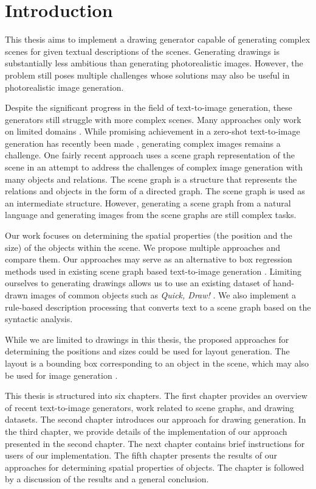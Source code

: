 \chapter*{Introduction}

This thesis aims to implement a drawing generator capable of generating complex scenes for given textual descriptions of the scenes. Generating drawings is substantially less ambitious than generating photorealistic images. However, the problem still poses multiple challenges whose solutions may also be useful in photorealistic image generation. 

\medskip

Despite the significant progress in the field of text-to-image generation, these generators still struggle with more complex scenes. Many approaches only work on limited domains \citep{zhang2017stackgan}. While promising achievement in a zero-shot text-to-image generation has recently been made \citep{ramesh2021zeroshot}, generating complex images remains a challenge. One fairly recent approach \citep{johnson2018image} uses a scene graph representation of the scene in an attempt to address the challenges of complex image generation with many objects and relations. The scene graph is a structure that represents the relations and objects in the form of a directed graph. The scene graph is used as an intermediate structure. However, generating a scene graph from a natural language and generating images from the scene graphs are still complex tasks. 

\medskip

Our work focuses on determining the spatial properties (the position and the size) of the objects within the scene. We propose multiple approaches and compare them. Our approaches may serve as an alternative to box regression methods used in existing scene graph based text-to-image generation \citep{johnson2018image,tripathi2019using}. Limiting ourselves to generating drawings allows us to use an existing dataset of hand-drawn images of common objects such as \emph{Quick, Draw!} \citep{quickdraw}. We also implement a rule-based description processing that converts text to a scene graph based on the syntactic analysis.

\medskip

While we are limited to drawings in this thesis, the proposed approaches for determining the positions and sizes could be used for layout generation. The layout is a bounding box corresponding to an object in the scene, which may also be used for image generation \citep{zhao2019image}. 

\medskip

This thesis is structured into six chapters. The first chapter provides an overview of recent text-to-image generators, work related to scene graphs, and drawing datasets. The second chapter introduces our approach for drawing generation. In the third chapter, we provide details of the implementation of our approach presented in the second chapter. The next chapter contains brief instructions for users of our implementation. The fifth chapter presents the results of our approaches for determining spatial properties of objects. The chapter is followed by a discussion of the results and a general conclusion.
